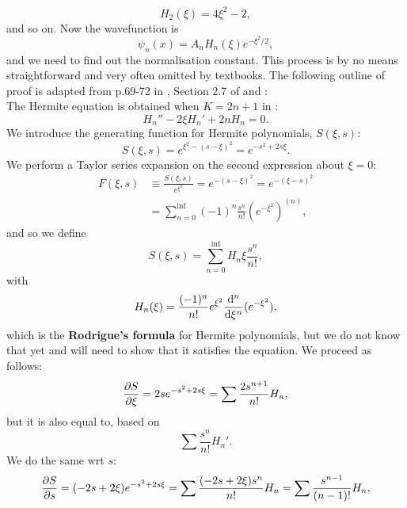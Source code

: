 \begin{equation}
H_2(\xi)=4\xi^2-2, 
\end{equation}
and so on. 
Now the wavefunction is 
\begin{equation}
\psi_n(x)=A_nH_n(\xi)e^{-\xi^2/2}, 
\end{equation}
and we need to find out the normalisation constant. This process is by no means straightforward and very often omitted by textbooks. The following outline of proof is adapted from p.69-72 in \cite{schiff}, Section 2.7 of \cite{herm_wiki} and \cite{herm_quora}:\\
The Hermite equation is obtained when $K=2n+1$ in :
\begin{equation}
\label{eqn_herm}
H_n''-2\xi H_n'+2nH_n=0.
\end{equation}
We introduce the generating function for Hermite polynomials, $S(\xi,s)$:
\begin{equation}
S(\xi,s)=e^{\xi^2-(s-\xi)^2}=e^{-s^2+2s\xi}.
\end{equation}
We perform a Taylor series expansion on the second expression about $\xi=0$: 
\begin{subequations}
\begin{align}
F(\xi,s)&\equiv\frac{S(\xi,s)}{e^{\xi^2}}=e^{-(s-\xi)^2}=e^{-(\xi-s)^2}\\
&=\sum_{n=0}^{\inf}(-1)^n\frac{s^n}{n!}(e^{-\xi^2})^{(n)}, 
\end{align}
\end{subequations}
and so we define
\begin{equation}
\label{hermite_genfun}
S(\xi,s)=\sum_{n=0}^{\inf}H_n{\xi}\frac{s^n}{n!},
\end{equation}
with
\begin{equation}
\label{rodform}
H_n(\xi)=\frac{(-1)^n}{n!}e^{\xi^2}\diff*[n]{(e^{-\xi^2})}\xi,
\end{equation}
which is the \textbf{Rodrigue's formula} for Hermite polynomials, but we do not know that yet and will need to show that it satisfies the equation. We proceed as follows: \\
\begin{equation}
\diffp S\xi=2se^{-s^2+2s\xi}=\sum\frac{2s^{n+1}}{n!}H_n,
\end{equation}
but it is also equal to, based on  
\begin{equation}
\sum\frac{s^n}{n!}H_n'.
\end{equation}
We do the same wrt $s$:
\begin{equation}
\diffp Ss=(-2s+2\xi)e^{-s^2+2s\xi}=\sum\frac{(-2s+2\xi)s^n}{n!}H_n=\sum\frac{s^{n-1}}{(n-1)!}H_n, 
\end{equation}
